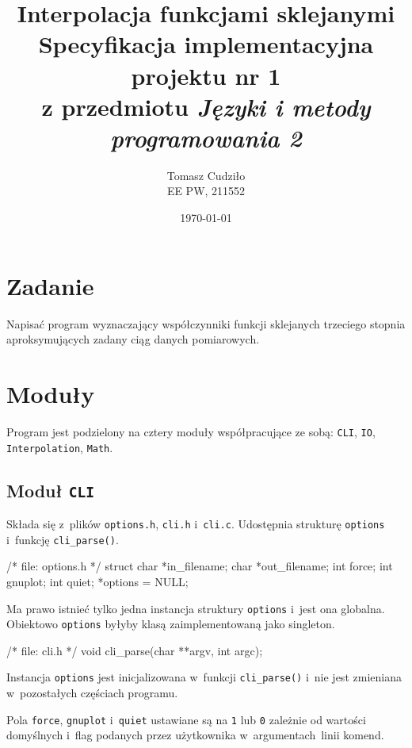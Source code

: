 \documentclass[10pt,a4paper]{article}
\newcommand{\p}[1]{\texttt{#1}}
\begin{document}
\title{ 
  Interpolacja funkcjami sklejanymi\\
  {\normalsize Specyfikacja implementacyjna projektu nr 1}\\\vspace{-12pt}
  {\normalsize z przedmiotu \emph{Języki i metody programowania 2}}
}
\author{
  Tomasz Cudziło\\
  {\small EE PW, 211552}
}
\date{\today}
\maketitle

\section*{Zadanie}
\label{sec:zadanie}

Napisać program wyznaczający współczynniki funkcji sklejanych trzeciego stopnia
aproksymujących zadany ciąg danych pomiarowych.

\vspace{24pt}

\section{Moduły}
Program jest podzielony na cztery moduły współpracujące ze sobą: \p{CLI},
\p{IO}, \p{Interpolation}, \p{Math}.

\subsection{Moduł \p{CLI}}
Składa się z~plików \p{options.h}, \p{cli.h} i~\p{cli.c}. Udostępnia strukturę
\p{options} i~funkcję \p{cli\_parse()}.
\begin{SmallVerbatim}
    /* file: options.h */
    struct {
      char *in_filename;
      char *out_filename;
      int force;
      int gnuplot;
      int quiet;
    } *options = NULL;
\end{SmallVerbatim}
Ma prawo istnieć tylko jedna instancja struktury \p{options} i~jest ona
globalna. Obiektowo \p{options} byłyby klasą zaimplementowaną jako singleton.
\begin{SmallVerbatim}
    /* file: cli.h */
    void cli_parse(char **argv, int argc);
\end{SmallVerbatim}
Instancja \p{options} jest inicjalizowana w~funkcji \p{cli\_parse()} i~nie jest
zmieniana w~pozostałych częściach programu.

Pola \p{force}, \p{gnuplot} i~\p{quiet} ustawiane są na \p{1} lub \p{0}
zależnie od wartości domyślnych i~flag podanych przez użytkownika
w~argumentach~linii komend.
\end{document}

